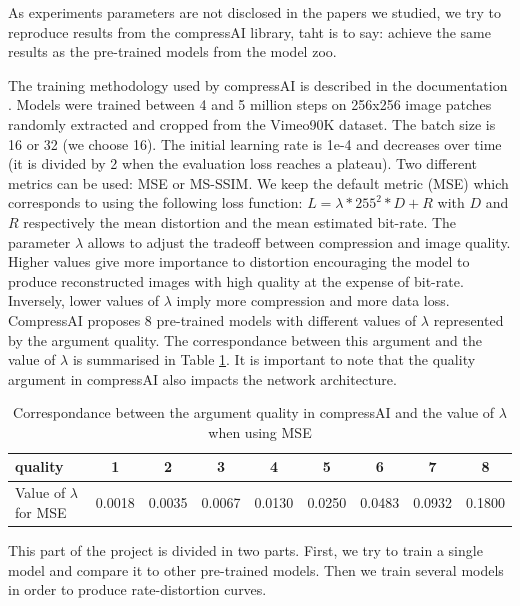As experiments parameters are not disclosed in the papers we studied, we try to reproduce results from the compressAI library, taht is to say: achieve the same results as the pre-trained models from the model zoo.

The training methodology used by compressAI is described in the documentation \cite{compressai_train}. Models were trained between 4 and 5 million steps on 256x256 image patches randomly extracted and cropped from the Vimeo90K dataset. The batch size is 16 or 32 (we choose 16). The initial learning rate is 1e-4 and decreases over time (it is divided by 2 when the evaluation loss reaches a plateau). Two different metrics can be used: MSE or MS-SSIM. We keep the default metric (MSE) which corresponds to using the following loss function: \(L = \lambda * 255^{2} * D + R\) with \(D\) and \(R\) respectively the mean distortion and the mean estimated bit-rate. The parameter \(\lambda\) allows to adjust the tradeoff between compression and image quality. Higher values give more importance to distortion encouraging the model to produce reconstructed images with high quality at the expense of bit-rate. Inversely, lower values of \(\lambda\) imply more compression and more data loss. CompressAI proposes 8 pre-trained models with different values of \(\lambda\) represented by the argument \textsf{quality}. The correspondance between this argument and the value of \(\lambda\) is summarised in Table \ref{tab}. It is important to note that the \textsf{quality} argument in compressAI also impacts the network architecture.

\begin{table}[]
    \centering
    \begin{tabular}{|l|c|c|c|c|c|c|c|c|}
    \hline
    \textsf{quality}                      & 1 & 2 & 3 & 4 & 5 & 6 & 7 & 8 \\ \hline
    Value of \(\lambda\) for MSE & 0.0018 & 0.0035 & 0.0067 & 0.0130 & 0.0250 & 0.0483 & 0.0932 & 0.1800 \\ \hline
    \end{tabular}
    \caption{Correspondance between the argument \textsf{quality} in compressAI and the value of \(\lambda\) when using MSE}
    \label{tab}
\end{table}

This part of the project is divided in two parts. First, we try to train a single model and compare it to other pre-trained models. Then we train several models in order to produce rate-distortion curves.

